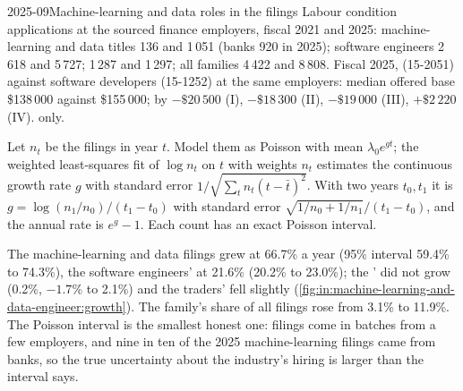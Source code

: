 \begin{dated}{2025-09}{Machine-learning and data roles in the filings}\label{dat:in:machine-learning-and-data-engineer:filings}
Labour condition applications at the sourced finance employers, fiscal 2021 and 2025: machine-learning and data titles
136 and 1\,051 (banks 920 in 2025); software engineers 2\,618 and 5\,727;  1\,287 and 1\,297;
all families 4\,422 and 8\,808. Fiscal 2025,  (15-2051) against software developers (15-1252) at the same
employers: median offered base \$138\,000 against \$155\,000; by  $-\$20\,500$ (I), $-\$18\,300$ (II),
$-\$19\,000$ (III), $+\$2\,220$ (IV).  only.
\end{dated}

\begin{method}\label{met:in:machine-learning-and-data-engineer:trend}
Let $n_t$ be the filings in year $t$. Model them as Poisson with mean $\lambda_0e^{g t}$; the weighted least-squares fit
of $\log n_t$ on $t$ with weights $n_t$ estimates the continuous growth rate $g$ with standard error
$1/\sqrt{\sum_t n_t(t-\bar t)^2}$. With two years $t_0,t_1$ it is $g=\log(n_1/n_0)/(t_1-t_0)$ with standard error
$\sqrt{1/n_0+1/n_1}/(t_1-t_0)$, and the annual rate is $e^g-1$. Each count has an exact Poisson interval.
\end{method}

The machine-learning and data filings grew at 66.7\% a year (95\% interval 59.4\% to 74.3\%), the software engineers' at
21.6\% (20.2\% to 23.0\%); the ' did not grow (0.2\%, $-1.7\%$ to 2.1\%) and the traders' fell
slightly (\cref{fig:in:machine-learning-and-data-engineer:growth}). The family's share of all filings rose from 3.1\% to
11.9\%. The Poisson interval is the smallest honest one: filings come in batches from a few employers, and nine in ten of
the 2025 machine-learning filings came from banks, so the true uncertainty about the industry's hiring is larger than the
interval says.

